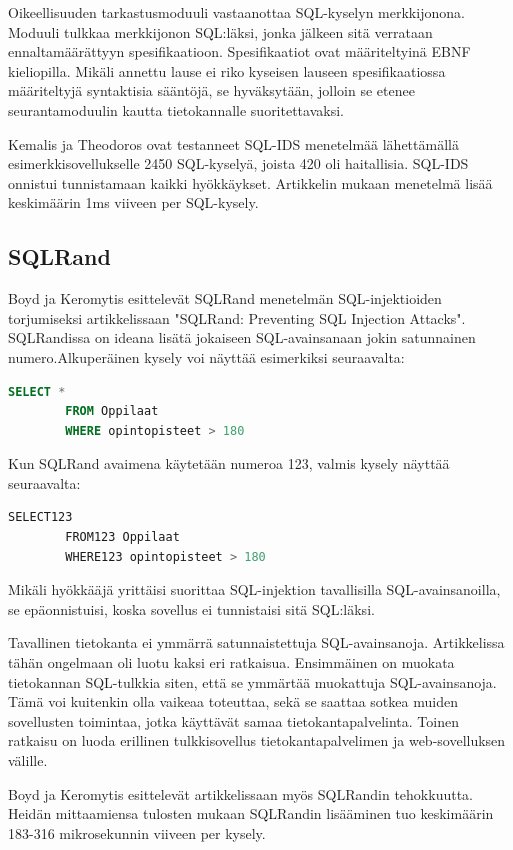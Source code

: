 \documentclass[finnish]{tktltiki2}
\theoremstyle{definition}
\theoremstyle{remark}
\begin{document}
	Oikeellisuuden tarkastusmoduuli vastaanottaa SQL-kyselyn merkkijonona. Moduuli tulkkaa merkkijonon SQL:läksi, jonka jälkeen sitä verrataan ennaltamäärättyyn spesifikaatioon. Spesifikaatiot ovat määriteltyinä EBNF kieliopilla. Mikäli annettu lause ei riko kyseisen lauseen spesifikaatiossa määriteltyjä syntaktisia sääntöjä, se hyväksytään, jolloin se etenee seurantamoduulin kautta tietokannalle suoritettavaksi.

	Kemalis ja Theodoros ovat testanneet SQL-IDS menetelmää lähettämällä esimerkkisovellukselle 2450 SQL-kyselyä, joista 420 oli haitallisia. SQL-IDS onnistui tunnistamaan kaikki hyökkäykset. Artikkelin mukaan menetelmä lisää keskimäärin 1ms viiveen per SQL-kysely.
					

		
	\subsection{SQLRand}
	Boyd ja Keromytis esittelevät SQLRand menetelmän SQL-injektioiden torjumiseksi artikkelissaan "SQLRand: Preventing SQL Injection Attacks"\space \cite{sqlrand}. SQLRandissa on ideana lisätä jokaiseen SQL-avainsanaan jokin satunnainen numero.Alkuperäinen kysely voi näyttää esimerkiksi seuraavalta:

		\begin{lstlisting}[language=sql]
		SELECT * 
		FROM Oppilaat
		WHERE opintopisteet > 180
		\end{lstlisting}
		Kun SQLRand avaimena käytetään numeroa 123, valmis kysely näyttää seuraavalta: 
		\begin{lstlisting}[language=sql]
		SELECT123
		FROM123 Oppilaat
		WHERE123 opintopisteet > 180
		\end{lstlisting}
		
	
	
	Mikäli hyökkääjä yrittäisi suorittaa SQL-injektion tavallisilla SQL-avainsanoilla, se epäonnistuisi, koska sovellus ei tunnistaisi sitä SQL:läksi.
	
	Tavallinen tietokanta ei ymmärrä satunnaistettuja SQL-avainsanoja. Artikkelissa tähän ongelmaan oli luotu kaksi eri ratkaisua. Ensimmäinen on muokata tietokannan SQL-tulkkia siten, että se ymmärtää muokattuja SQL-avainsanoja. Tämä voi kuitenkin olla vaikeaa toteuttaa, sekä se saattaa sotkea muiden sovellusten toimintaa, jotka käyttävät samaa tietokantapalvelinta. Toinen ratkaisu on luoda erillinen tulkkisovellus tietokantapalvelimen ja web-sovelluksen välille.
	
	Boyd ja Keromytis esittelevät artikkelissaan myös SQLRandin tehokkuutta. Heidän mittaamiensa tulosten mukaan SQLRandin lisääminen tuo keskimäärin 183-316 mikrosekunnin viiveen per kysely.
	
\end{document}
